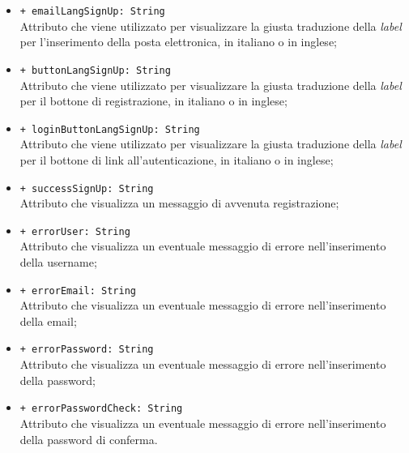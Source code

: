 \begin{itemize}
\begin{itemize}
		\item \texttt{+ emailLangSignUp: String} \\ Attributo che viene utilizzato per visualizzare la giusta traduzione della \textit{label} per l'inserimento della posta elettronica, in italiano o in inglese;
		\item \texttt{+ buttonLangSignUp: String} \\ Attributo che viene utilizzato per visualizzare la giusta traduzione della \textit{label} per il bottone di registrazione, in italiano o in inglese;
		\item \texttt{+ loginButtonLangSignUp: String} \\ Attributo che viene utilizzato per visualizzare la giusta traduzione della \textit{label} per il bottone di link all'autenticazione, in italiano o in inglese;
		\item \texttt{+ successSignUp: String} \\ Attributo che visualizza un messaggio di avvenuta registrazione;
		\item \texttt{+ errorUser: String} \\ Attributo che visualizza un eventuale messaggio di errore nell'inserimento della username;
		\item \texttt{+ errorEmail: String} \\ Attributo che visualizza un eventuale messaggio di errore nell'inserimento della email;
		\item \texttt{+ errorPassword: String} \\ Attributo che visualizza un eventuale messaggio di errore nell'inserimento della password;
		\item \texttt{+ errorPasswordCheck: String} \\ Attributo che visualizza un eventuale messaggio di errore nell'inserimento della password di conferma.
	\end{itemize}
\end{itemize}